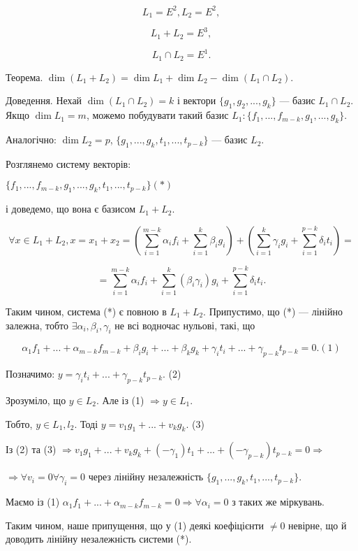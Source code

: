 $$L_1 = E^2, L_2 = E^2,$$

$$L_1 + L_2 = E^3,$$

$$L_1 \cap L_2 = E^1.$$



Теорема. $\dim(L_1 + L_2) = \dim L_1 + \dim L_2 - \dim(L_1 \cap L_2)$.

Доведення. Нехай $\dim(L_1 \cap L_2) = k$ і вектори $\{g_1, g_2, ..., g_k\}$ --- базис
$L_1 \cap L_2$. Якщо $\dim L_1 = m$, можемо побудувати такий базис
$L_1: \{f_1, ..., f_{m-k}, g_1, ..., g_k\}$.


Аналогічно: $\dim L_2 = p$, $\{g_1, ..., g_k, t_1, ..., t_{p-k}\}$ --- базис $L_2$.

Розглянемо систему векторів:

$\{f_1, ..., f_{m-k}, g_1, ..., g_k, t_1, ..., t_{p-k}\} (*)$

і доведемо, що вона є базисом $L_1 + L_2$.

$$\forall x \in L_1 + L_2, x = x_1 + x_2
= \left( \sum\limits_{i=1}^{m-k} \alpha_i f_i
		+ \sum\limits_{i=1}^{k} \beta_i g_i \right)
+ \left( \sum\limits_{i=1}^{k} \gamma_i g_i
		+ \sum\limits_{i=1}^{p-k} \delta_i t_i \right) = $$
		
$$= \sum\limits_{i=1}^{m-k} \alpha_i f_i
+ \sum\limits_{i=1}^{k} (\beta_i \gamma_i)g_i
+ \sum\limits_{i=1}^{p-k} \delta_i t_i.$$


Таким чином, система (*) є повною в $L_1 + L_2$. Припустимо, що (*) ---
лінійно залежна, тобто $\exists \alpha_i, \beta_i, \gamma_i$ не всі водночас нульові, такі, що

$$\alpha_1 f_1 + ... + \alpha_{m-k} f_{m-k} + \beta_i g_i + ... + \beta_k g_k + \gamma_i t_i + ... + \gamma_{p-k} t_{p-k} = 0. (1)$$

Позначимо: $y = \gamma_i t_i + ... + \gamma_{p-k} t_{p-k}$. (2)

Зрозуміло, що $y \in L_2$. Але із (1) $\Rightarrow y \in L_1$.

Тобто, $y \in L_1, l_2$. Тоді $y = v_1 g_1 + ... + v_k g_k$. (3)

Із (2) та (3) $\Rightarrow v_1 g_1 + ... + v_k g_k + (-\gamma_1) t_1 + ... + (-\gamma_{p-k}) t_{p-k} = 0 \Rightarrow$

$\Rightarrow \forall v_i = 0 \forall \gamma_i = 0$
через лінійну незалежність $\{g_1, ..., g_k, t_1, ..., t_{p-k}\}$.

Маємо із (1) $\alpha_1 f_1 + ... + \alpha_{m-k} f_{m-k} = 0 \Rightarrow \forall \alpha_i = 0$ з
таких же міркувань.

Таким чином, наше припущення, що у (1) деякі коефіцієнти $\neq 0$ невірне,
що й доводить лінійну незалежність системи (*).

